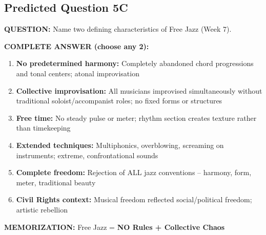 \documentclass[11pt]{article}
\begin{document}
\subsection*{Predicted Question 5C}

\begin{mdframed}[backgroundcolor=questioncolor!10, linewidth=2pt]
\textbf{\textcolor{questioncolor}{QUESTION:}} Name two defining characteristics of Free Jazz (Week 7).
\end{mdframed}

\begin{mdframed}[backgroundcolor=answercolor!10, linewidth=2pt]
\textbf{\textcolor{answercolor}{COMPLETE ANSWER (choose any 2):}}

\begin{enumerate}[leftmargin=*, nosep]
    \item \textbf{No predetermined harmony:} Completely abandoned chord progressions and tonal centers; atonal improvisation
    
    \item \textbf{Collective improvisation:} All musicians improvised simultaneously without traditional soloist/accompanist roles; no fixed forms or structures
    
    \item \textbf{Free time:} No steady pulse or meter; rhythm section creates texture rather than timekeeping
    
    \item \textbf{Extended techniques:} Multiphonics, overblowing, screaming on instruments; extreme, confrontational sounds
    
    \item \textbf{Complete freedom:} Rejection of ALL jazz conventions – harmony, form, meter, traditional beauty
    
    \item \textbf{Civil Rights context:} Musical freedom reflected social/political freedom; artistic rebellion
\end{enumerate}

\vspace{5pt}
\end{mdframed}

\textbf{MEMORIZATION:} Free Jazz = \textbf{\textcolor{freejazz}{NO Rules + Collective Chaos}}
\end{document}

